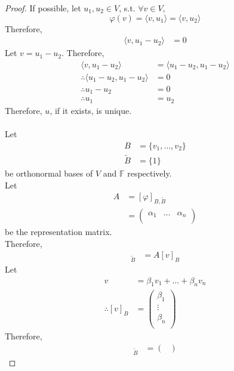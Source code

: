 \documentclass[fleqn, a4paper, 12pt]{article}
\theoremstyle{definition}
\theoremstyle{theorem}
\theoremstyle{remark}
\numberwithin{corollary}{theorem}
\numberwithin{equation}{theorem}
\begin{document}
\begin{proof}
	If possible, let $u_1, u_2 \in V$, s.t. $\forall v \in V$,
	\begin{equation*}
		\varphi(v) = \langle v, u_1 \rangle = \langle v, u_2 \rangle
	\end{equation*}
	Therefore,
	\begin{align*}
		\langle v, u_1 - u_2 \rangle &= 0
	\end{align*}
	Let $v = u_1 - u_2$. Therefore,
	\begin{align*}
		\langle v, u_1 - u_2 \rangle &= \langle u_1 - u_2, u_1 - u_2 \rangle\\
		\therefore \langle u_1 - u_2, u_1 - u_2 \rangle &= 0\\
		\therefore u_1 - u_2 &= 0\\
		\therefore u_1 &= u_2
	\end{align*}
	Therefore, $u$, if it exists, is unique.\\
	~\\
	Let
	\begin{align*}
		B &= \{v_1, \dots, v_2\}\\
		\widetilde{B} &= \{1\}
	\end{align*}
	be orthonormal bases of $V$ and $\mathbb{F}$ respectively.\\
	Let
	\begin{align*}
		A &= [\varphi]_{B, \widetilde{B}}\\
		&=
			\begin{pmatrix}
				\alpha_1 & \dots & \alpha_n\\
			\end{pmatrix}
	\end{align*} 
	be the representation matrix.\\
	Therefore,
	\begin{align*}
		[\varphi(v)]_{\widetilde{B}} &= A [v]_B
	\end{align*}
	Let
	\begin{align*}
		v &= \beta_1 v_1 + \dots + \beta_n v_n\\
		\therefore [v]_B &=
			\begin{pmatrix}
				\beta_1\\
				\vdots\\
				\beta_n\\
			\end{pmatrix}
	\end{align*}
	Therefore,
	\begin{align*}
		[\varphi(v)]_{\widetilde{B}} &= 
			\begin{pmatrix}

\end{pmatrix}
\end{align*}
\end{proof}
\end{document}
